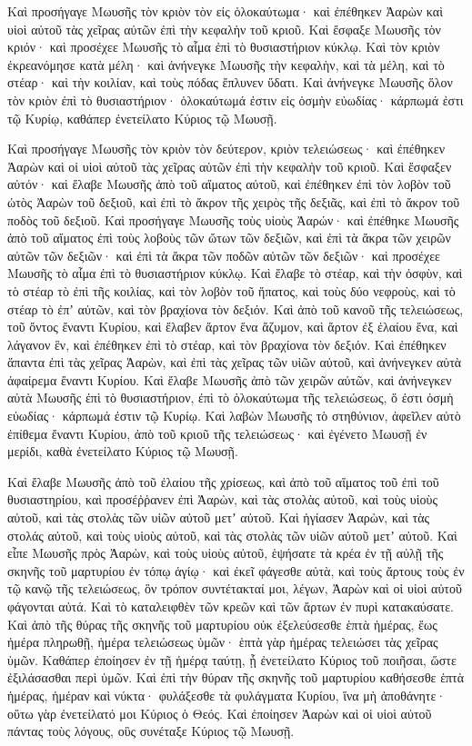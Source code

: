{Καὶ προσήγαγε Μωυσῆς τὸν κριὸν τὸν εἰς ὁλοκαύτωμα· καὶ ἐπέθηκεν Ἀαρὼν καὶ υἱοὶ αὐτοῦ τὰς χεῖρας αὐτῶν ἐπὶ τὴν κεφαλὴν τοῦ κριοῦ. Καὶ ἔσφαξε Μωυσῆς τὸν κριόν· καὶ προσέχεε Μωυσῆς τὸ αἷμα ἐπὶ τὸ θυσιαστήριον κύκλῳ.
Καὶ τὸν κριὸν ἐκρεανόμησε κατὰ μέλη· καὶ ἀνήνεγκε Μωυσῆς τὴν κεφαλὴν, καὶ τὰ μέλη, καὶ τὸ στέαρ· καὶ τὴν κοιλίαν, καὶ τοὺς πόδας ἔπλυνεν ὕδατι.
Καὶ ἀνήνεγκε Μωυσῆς ὅλον τὸν κριὸν ἐπὶ τὸ θυσιαστήριον· ὁλοκαύτωμά ἐστιν εἰς ὀσμὴν εὐωδίας· κάρπωμά ἐστι τῷ Κυρίῳ, καθάπερ ἐνετείλατο Κύριος τῷ Μωυσῇ.
\par }{\PP {}Καὶ προσήγαγε Μωυσῆς τὸν κριὸν τὸν δεύτερον, κριὸν τελειώσεως· καὶ ἐπέθηκεν Ἀαρὼν καὶ οἱ υἱοὶ αὐτοῦ τὰς χεῖρας αὐτῶν ἐπὶ τὴν κεφαλὴν τοῦ κριοῦ.
Καὶ ἔσφαξεν αὐτόν· καὶ ἔλαβε Μωυσῆς ἀπὸ τοῦ αἵματος αὐτοῦ, καὶ ἐπέθηκεν ἐπὶ τὸν λοβὸν τοῦ ὠτὸς Ἀαρὼν τοῦ δεξιοῦ, καὶ ἐπὶ τὸ ἄκρον τῆς χειρὸς τῆς δεξιᾶς, καὶ ἐπὶ τὸ ἄκρον τοῦ ποδὸς τοῦ δεξιοῦ.
Καὶ προσήγαγε Μωυσῆς τοὺς υἱοὺς Ἀαρών· καὶ ἐπέθηκε Μωυσῆς ἀπὸ τοῦ αἵματος ἐπὶ τοὺς λοβοὺς τῶν ὤτων τῶν δεξιῶν, καὶ ἐπὶ τὰ ἄκρα τῶν χειρῶν αὐτῶν τῶν δεξιῶν· καὶ ἐπὶ τὰ ἄκρα τῶν ποδῶν αὐτῶν τῶν δεξιῶν· καὶ προσέχεε Μωυσῆς τὸ αἷμα ἐπὶ τὸ θυσιαστήριον κύκλῳ.
Καὶ ἔλαβε τὸ στέαρ, καὶ τὴν ὀσφὺν, καὶ τὸ στέαρ τὸ ἐπὶ τῆς κοιλίας, καὶ τὸν λοβὸν τοῦ ἥπατος, καὶ τοὺς δύο νεφροὺς, καὶ τὸ στέαρ τὸ ἐπʼ αὐτῶν, καὶ τὸν βραχίονα τὸν δεξιόν.
Καὶ ἀπὸ τοῦ κανοῦ τῆς τελειώσεως, τοῦ ὄντος ἔναντι Κυρίου, καὶ ἔλαβεν ἄρτον ἕνα ἄζυμον, καὶ ἄρτον ἐξ ἐλαίου ἕνα, καὶ λάγανον ἓν, καὶ ἐπέθηκεν ἐπὶ τὸ στέαρ, καὶ τὸν βραχίονα τὸν δεξιόν.
Καὶ ἐπέθηκεν ἅπαντα ἐπὶ τὰς χεῖρας Ἀαρὼν, καὶ ἐπὶ τὰς χεῖρας τῶν υἱῶν αὐτοῦ, καὶ ἀνήνεγκεν αὐτὰ ἀφαίρεμα ἔναντι Κυρίου.
Καὶ ἔλαβε Μωυσῆς ἀπὸ τῶν χειρῶν αὐτῶν, καὶ ἀνήνεγκεν αὐτὰ Μωυσῆς ἐπὶ τὸ θυσιαστήριον, ἐπὶ τὸ ὁλοκαύτωμα τῆς τελειώσεως, ὅ ἐστι ὀσμὴ εὐωδίας· κάρπωμά ἐστιν τῷ Κυρίῳ.
Καὶ λαβὼν Μωυσῆς τὸ στηθύνιον, ἀφεῖλεν αὐτὸ ἐπίθεμα ἔναντι Κυρίου, ἀπὸ τοῦ κριοῦ τῆς τελειώσεως· καὶ ἐγένετο Μωυσῇ ἐν μερίδι, καθὰ ἐνετείλατο Κύριος τῷ Μωυσῇ.
\par }{\PP {}Καὶ ἔλαβε Μωυσῆς ἀπὸ τοῦ ἐλαίου τῆς χρίσεως, καὶ ἀπὸ τοῦ αἵματος τοῦ ἐπὶ τοῦ θυσιαστηρίου, καὶ προσέῤῥανεν ἐπὶ Ἀαρὼν, καὶ τὰς στολὰς αὐτοῦ, καὶ τοὺς υἱοὺς αὐτοῦ, καὶ τὰς στολὰς τῶν υἱῶν αὐτοῦ μετʼ αὐτοῦ.
Καὶ ἡγίασεν Ἀαρὼν, καὶ τὰς στολάς αὐτοῦ, καὶ τοὺς υἱοὺς αὐτοῦ, καὶ τὰς στολὰς τῶν υἱῶν αὐτοῦ μετʼ αὐτοῦ.
Καὶ εἶπε Μωυσῆς πρὸς Ἀαρὼν, καὶ τοὺς υἱοὺς αὐτοῦ, ἑψήσατε τὰ κρέα ἐν τῇ αὐλῇ τῆς σκηνῆς τοῦ μαρτυρίου ἐν τόπῳ ἁγίῳ· καὶ ἐκεῖ φάγεσθε αὐτὰ, καὶ τοὺς ἄρτους τοὺς ἐν τῷ κανῷ τῆς τελειώσεως, ὃν τρόπον συντέτακταί μοι, λέγων, Ἀαρὼν καὶ οἱ υἱοὶ αὐτοῦ φάγονται αὐτά.
Καὶ τὸ καταλειφθὲν τῶν κρεῶν καὶ τῶν ἄρτων ἐν πυρὶ κατακαύσατε.
Καὶ ἀπὸ τῆς θύρας τῆς σκηνῆς τοῦ μαρτυρίου οὐκ ἐξελεύσεσθε ἑπτὰ ἡμέρας, ἕως ἡμέρα πληρωθῇ, ἡμέρα τελειώσεως ὑμῶν· ἑπτὰ γὰρ ἡμέρας τελειώσει τὰς χεῖρας ὑμῶν.
Καθάπερ ἐποίησεν ἐν τῇ ἡμέρᾳ ταύτῃ, ᾗ ἐνετείλατο Κύριος τοῦ ποιῆσαι, ὥστε ἐξιλάσασθαι περὶ ὑμῶν.
Καὶ ἐπὶ τὴν θύραν τῆς σκηνῆς τοῦ μαρτυρίου καθήσεσθε ἑπτὰ ἡμέρας, ἡμέραν καὶ νύκτα· φυλάξεσθε τὰ φυλάγματα Κυρίου, ἵνα μὴ ἀποθάνητε· οὕτω γὰρ ἐνετείλατό μοι Κύριος ὁ Θεός.
Καὶ ἐποίησεν Ἀαρὼν καὶ οἱ υἱοὶ αὐτοῦ πάντας τοὺς λόγους, οὓς συνέταξε Κύριος τῷ Μωυσῇ.

}
